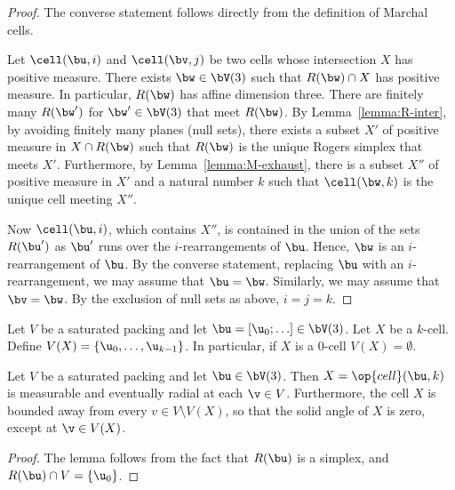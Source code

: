 \begin{proof} 
The converse statement follows directly from the definition of Marchal cells.

Let $\cell(\bu,i)$ and $\cell(\bv,j)$ be two cells whose intersection
$X$ has positive measure.  There exists $\bw\in \bV(3)$ such that
$R(\bw)\cap X$ has positive measure.  In particular, $R(\bw)$ has
affine dimension three.  There are finitely many $R(\bw')$ for $\bw'\in
\bV(3)$ that meet $R(\bw)$.  By Lemma~\ref{lemma:R-inter}, by avoiding
finitely many planes (null sets), there exists a subset $X'$ of positive measure
in
$X\cap R(\bw)$ such that $R(\bw)$ is the unique Rogers simplex that
meets $X'$.  Furthermore, by Lemma~\ref{lemma:M-exhaust}, there is a subset $X''$ of
positive measure in $X'$ and a natural number $k$ such that $\cell(\bw,k)$ is
the unique cell meeting $X''$.

Now $\cell(\bu,i)$, which contains $X''$, 
is contained in the union of the sets $R(\bu')$ as $\bu'$ runs over the
$i$-rearrangements of $\bu$.  Hence, $\bw$ is an $i$-rearrangement of
$\bu$.  By the converse statement, replacing $\bu$ with an
$i$-rearrangement, we may assume that $\bu=\bw$.  Similarly, we may
assume that $\bv=\bw$.  By the exclusion of null sets as above, $i=j=k$.
\end{proof}



\begin{definition}
  Let $V$ be a saturated packing and let $\bu=[\u_0;\ldots]\in
  \bV(3)$.  Let $X$ be a $k$-cell.  Define $V(X) =
  \{\u_0,\ldots,\u_{k-1}\}$.  In particular, if $X$ is a $0$-cell
  $V(X)=\emptyset$.
\end{definition}


\begin{lemma}\label{lemma:cell-radial}
  Let $V$ be a saturated packing and let $\bu\in \bV(3)$.  Then
  $X=\op{cell}(\bu,k)$ is measurable and eventually radial at each
  $\v\in V$.  Furthermore, the cell $X$ is bounded away from every
  $v\in V\setminus V(X)$, so that the solid angle of $X$ is zero, except
  at $\v\in V(X)$.
\end{lemma}

\begin{proof} The lemma follows from the fact that $R(\bu)$ is a simplex, and
$R(\bu)\cap V = \{\u_0\}$.
\end{proof}



